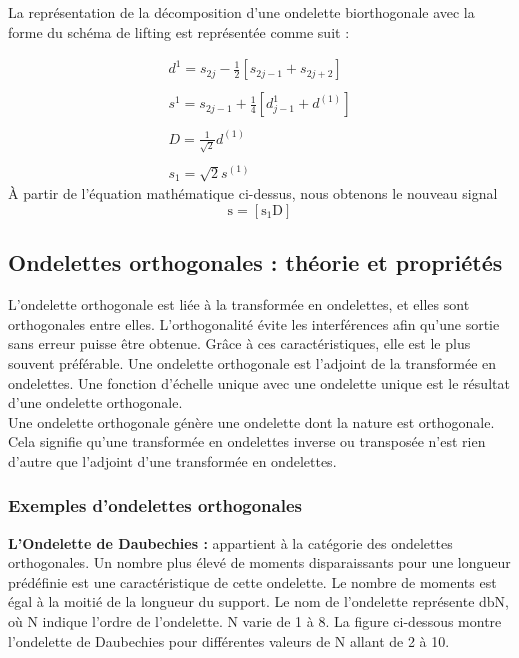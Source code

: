 La représentation de la décomposition d'une ondelette biorthogonale avec la forme du schéma de lifting est représentée comme suit :

\begin{equation}
    \begin{array}{l}
        {d^{1} = s_{2j} - \frac{1}{2}\left[s_{2j - 1} + s_{2j + 2}\right]}\\
        {}\\
        {s^{1}=s_{2j - 1} + \frac{1}{4}\left[d_{j - 1}^{1} + d^{(1)}\right]}\\
        {}\\ 
        {D = \frac{1}{\sqrt{2}} d^{(1)}}\\ {}\\ {s_{1} = \sqrt{2} s^{(1)}} 
        
    \end{array} 
\end{equation}
À partir de l'équation mathématique ci-dessus, nous obtenons le nouveau signal 
\begin{equation}\mathrm{s} = [\mathrm{s}_1\mathrm{D}]\end{equation}
\enlargethispage{\baselineskip}
\subsection{Ondelettes orthogonales : théorie et propriétés}
L'ondelette orthogonale est liée à la transformée en ondelettes, et elles sont orthogonales entre elles. L'orthogonalité évite les interférences afin qu'une sortie sans erreur puisse être obtenue. Grâce à ces caractéristiques, elle est le plus souvent préférable. Une ondelette orthogonale est l'adjoint de la transformée en ondelettes. Une fonction d'échelle unique avec une ondelette unique est le résultat d'une ondelette orthogonale.\\
Une ondelette orthogonale génère une ondelette dont la nature est orthogonale. Cela signifie qu'une transformée en ondelettes inverse ou transposée n'est rien d'autre que l'adjoint d'une transformée en ondelettes.

\subsubsection{Exemples d'ondelettes orthogonales}
\textbf{L'Ondelette de Daubechies : } appartient à la catégorie des ondelettes orthogonales. Un nombre plus élevé de moments disparaissants pour une longueur prédéfinie est une caractéristique de cette ondelette. Le nombre de moments est égal à la moitié de la longueur du support. Le nom de l'ondelette représente dbN, où N indique l'ordre de l'ondelette. N varie de 1 à 8. La figure ci-dessous montre l'ondelette de Daubechies pour différentes valeurs de N allant de 2 à 10.

